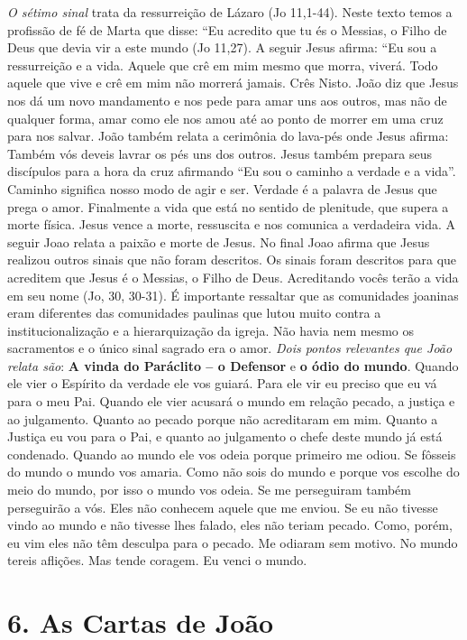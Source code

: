 \documentclass[
]{book}
\begin{document}
\emph{O sétimo sinal} trata da ressurreição de Lázaro (Jo 11,1-44). Neste texto temos a profissão de fé de Marta que disse: ``Eu acredito que tu és o Messias, o Filho de Deus que devia vir a este mundo (Jo 11,27). A seguir Jesus afirma: ``Eu sou a ressurreição e a vida. Aquele que crê em mim mesmo que morra, viverá. Todo aquele que vive e crê em mim não morrerá jamais. Crês Nisto. João diz que Jesus nos dá um novo mandamento e nos pede para amar uns aos outros, mas não de qualquer forma, amar como ele nos amou até ao ponto de morrer em uma cruz para nos salvar. João também relata a cerimônia do lava-pés onde Jesus afirma: Também vós deveis lavrar os pés uns dos outros. Jesus também prepara seus discípulos para a hora da cruz afirmando ``Eu sou o caminho a verdade e a vida''. Caminho significa nosso modo de agir e ser. Verdade é a palavra de Jesus que prega o amor. Finalmente a vida que está no sentido de plenitude, que supera a morte física. Jesus vence a morte, ressuscita e nos comunica a verdadeira vida. A seguir Joao relata a paixão e morte de Jesus. No final Joao afirma que Jesus realizou outros sinais que não foram descritos. Os sinais foram descritos para que acreditem que Jesus é o Messias, o Filho de Deus. Acreditando vocês terão a vida em seu nome (Jo, 30, 30-31). É importante ressaltar que as comunidades joaninas eram diferentes das comunidades paulinas que lutou muito contra a institucionalização e a hierarquização da igreja. Não havia nem mesmo os sacramentos e o único sinal sagrado era o amor. \emph{Dois pontos relevantes que João relata são}: \textbf{A vinda do Paráclito -- o Defensor} e \textbf{o ódio do mundo}. Quando ele vier o Espírito da verdade ele vos guiará. Para ele vir eu preciso que eu vá para o meu Pai. Quando ele vier acusará o mundo em relação pecado, a justiça e ao julgamento. Quanto ao pecado porque não acreditaram em mim. Quanto a Justiça eu vou para o Pai, e quanto ao julgamento o chefe deste mundo já está condenado. Quando ao mundo ele vos odeia porque primeiro me odiou. Se fôsseis do mundo o mundo vos amaria. Como não sois do mundo e porque vos escolhe do meio do mundo, por isso o mundo vos odeia. Se me perseguiram também perseguirão a vós. Eles não conhecem aquele que me enviou. Se eu não tivesse vindo ao mundo e não tivesse lhes falado, eles não teriam pecado. Como, porém, eu vim eles não têm desculpa para o pecado. Me odiaram sem motivo. No mundo tereis aflições. Mas tende coragem. Eu venci o mundo.

\hypertarget{as-cartas-de-jouxe3o}{%
\section*{6. As Cartas de João}\label{as-cartas-de-jouxe3o}}
\end{document}
